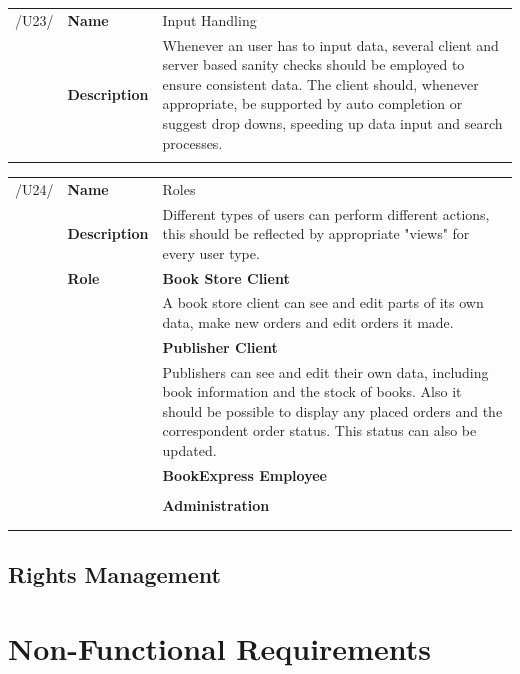 \documentclass[11pt,a4paper,oneside,svgnames]{report}
\begin{document}
\noindent
\begin{tabular}{llp{10cm}}
\cellcolor{white}/U23/	& \textbf{Name}			& Input Handling\\
\cellcolor{white}		& \textbf{Description}	& Whenever an user has to input data, several client and server based sanity checks should be employed to ensure consistent data. The client should, whenever appropriate, be supported by auto completion or suggest drop downs, speeding up data input and search processes.\\
\cellcolor{white}		\hfill \\
\end{tabular}
\noindent
\begin{tabular}{llp{10cm}}
\cellcolor{white}/U24/	& \textbf{Name}			& Roles\\
\cellcolor{white}		& \textbf{Description}	& Different types of users can perform different actions, this should be reflected by appropriate "views" for every user type.\\
\cellcolor{white}		& \textbf{Role}			& \textbf{Book Store Client}\\
\cellcolor{white}		&						& A book store client can see and edit parts of its own data, make new orders and edit orders it made.\\
\cellcolor{white}		&						& \textbf{Publisher Client}\\
\cellcolor{white}		&						& Publishers can see and edit their own data, including book information and the stock of books. Also it should be possible to display any placed orders and the correspondent order status. This status can also be updated.\\
\cellcolor{white}		&						& \textbf{BookExpress Employee}\\
\cellcolor{white}		&						& \\
\cellcolor{white}		&						& \textbf{Administration}\\
\cellcolor{white}		&						& \\
\cellcolor{white}		\hfill \\
\end{tabular}

\section{Rights Management}


\chapter{Non-Functional Requirements}
\end{document}
